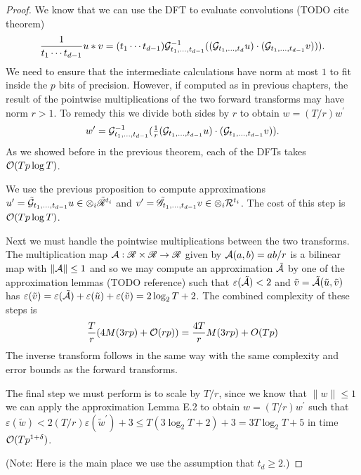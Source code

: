 \begin{proof}
    We know that we can use the DFT to evaluate convolutions (TODO cite theorem)
    \[
        \frac{1}{t_1 \cdots t_{d-1}}u \ast v = (t_1 \cdots t_{d-1})\mathcal G^{-1}_{t_1, \ldots, t_{d-1}}((\mathcal G_{t_1, \ldots, t_d}u)\cdot (\mathcal G_{t_1, \ldots, t_{d-1}} v))).
    \]
    We need to ensure that the intermediate calculations have norm at most $1$ to fit inside the $p$ bits of precision. However, if computed as in previous chapters, the result of the pointwise multiplications of the two forward transforms may have norm $r > 1$. To remedy this we divide both sides by $r$ to obtain $w = (T/r)w^\prime$
    \[
        w^\prime = \mathcal G^{-1}_{t_1, \ldots, t_{d-1}}(\tfrac{1}{r}(\mathcal G_{t_1, \ldots, t_{d-1}}u) \cdot (\mathcal G_{t_1, \ldots, t_{d-1}}v)).
    \]
    As we showed before in the previous theorem, each of the DFTs takes $\mathcal O(Tp\log T)$.

    We use the previous proposition to compute approximations $u^\prime = \tilde{\mathcal G}_{t_1, \ldots, t_{d-1}} u \in \otimes_i \tilde{\mathscr{R}}^{t_i}$ and $v^\prime = \tilde{\mathscr{G}}_{t_1, \ldots, t_{d-1}} v \in \otimes_i \mathcal R^{t_i}$. The cost of this step is $\mathcal O(Tp \log T)$.

    Next we must handle the pointwise multiplications between the two transforms. The multiplication map $\mathcal A: \mathscr{R} \times \mathscr{R} \to \mathscr{R}$ given by $\mathcal A(a, b) = ab/r$ is a bilinear map with $\|\mathcal A\| \le 1$ and so we may compute an approximation $\tilde{\mathcal A}$ by one of the approximation lemmas (TODO reference) such that $\varepsilon(\tilde{\mathcal A}) < 2$ and $\tilde{v} = \tilde{\mathcal A}(\tilde{u}, \tilde{v})$ has $\varepsilon(\tilde{v}) = \varepsilon(\tilde{\mathcal A}) + \varepsilon(\tilde{u}) + \varepsilon(\tilde{v}) = 2\log_2 T + 2$. The combined complexity of these steps is
    \[
        \frac{T}{r}(4M(3rp) + \mathcal O(rp)) = \frac{4T}{r} M(3rp) + O(Tp)
    \]
    The inverse transform follows in the same way with the same complexity and error bounds as the forward transforms.

    The final step we must perform is to scale by $T/r$, since we know that $\|w\| \le 1$ we can apply the approximation Lemma E.2 to obtain $w = (T/r)w^\prime$ such that $\varepsilon(\tilde{w}) < 2(T/r)\varepsilon(\tilde{w}^\prime) + 3 \le T(3 \log_2 T + 2) + 3 = 3T\log_2 T + 5$ in time $\mathcal O(Tp^{1 + \delta})$.

    (Note: Here is the main place we use the assumption that $t_d \ge 2$.)
\end{proof}

